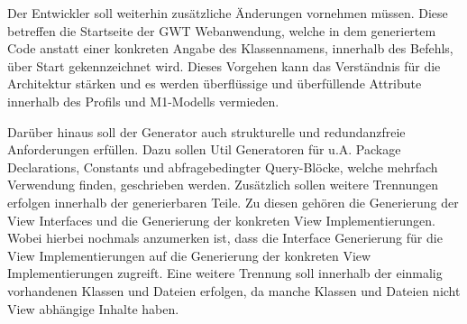 Der Entwickler soll weiterhin zusätzliche Änderungen vornehmen müssen. Diese
betreffen die Startseite der GWT Webanwendung, welche in dem generiertem
Code anstatt einer konkreten Angabe des Klassennamens, innerhalb des Befehls,
über \grqq{}Start\grqq{} gekennzeichnet wird. Dieses Vorgehen kann das Verständnis
für die Architektur stärken und es werden überflüssige und überfüllende
Attribute innerhalb des Profils und M1-Modells vermieden.

Darüber hinaus soll der Generator auch strukturelle und redundanzfreie
Anforderungen erfüllen. Dazu sollen Util Generatoren für u.A.
Package Declarations, Constants und abfragebedingter Query-Blöcke, welche
mehrfach Verwendung finden, geschrieben werden. Zusätzlich sollen weitere
Trennungen erfolgen innerhalb der generierbaren Teile. Zu diesen gehören die
Generierung der View Interfaces und die Generierung der konkreten View Implementierungen. Wobei
hierbei nochmals anzumerken ist, dass die Interface Generierung für die View
Implementierungen auf die Generierung der konkreten View Implementierungen
zugreift. Eine weitere Trennung soll innerhalb der einmalig vorhandenen Klassen
und Dateien erfolgen, da manche Klassen und Dateien nicht View abhängige Inhalte
haben.
